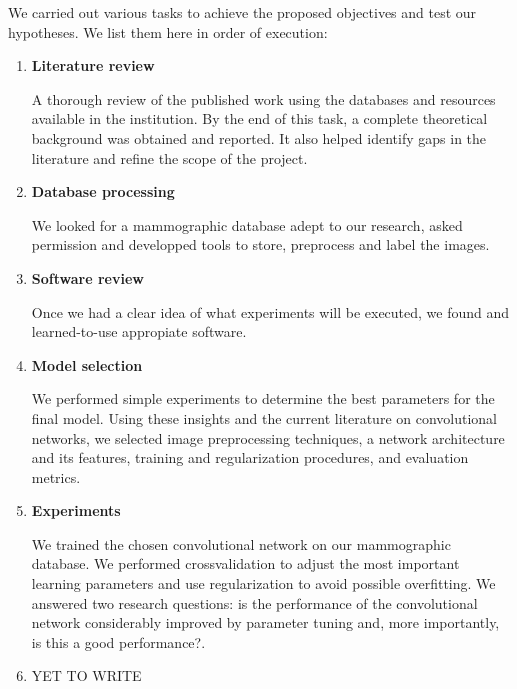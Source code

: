 We carried out various tasks to achieve the proposed objectives and test our hypotheses. We list them here in order of execution:
\begin{enumerate}
	\item \textbf{Literature review}

A thorough review of the published work using the databases and resources available in the institution. By the end of this task, a complete theoretical background was obtained and reported. It also helped identify gaps in the literature and refine the scope of the project.
	\item \textbf{Database processing}

We looked for a mammographic database adept to our research, asked permission and developped tools to store, preprocess and label the images.
	\item \textbf{Software review}

Once we had a clear idea of what experiments will be executed, we found and learned-to-use appropiate software. 

\begin{comment}
	\item \textbf{Exploratory experiments}

We will train a standard convolutional networks with fixed parameters for the detection of microcalcifications and the detection of masses. We want to answer whether the convolutional network is powerful enough to learn the task in hand, whether we have enough data for the network to learn or more data augmentation is needed and wether the computational resources and parameter settings allow the network to learn in a timely fashion.
\end{comment}
	\item \textbf{Model selection}

We performed simple experiments to determine the best parameters for the final model. Using these insights and the current literature on convolutional networks, we selected image preprocessing techniques, a network architecture and its features, training and regularization procedures, and evaluation metrics.
	\item \textbf{Experiments}

We trained the chosen convolutional network on our mammographic database. We performed crossvalidation to adjust the most important learning parameters and use regularization to avoid possible overfitting. We answered two research questions: is the performance of the convolutional network considerably improved by parameter tuning and, more importantly, is this a good performance?.
	\item YET TO WRITE


\end{enumerate}
